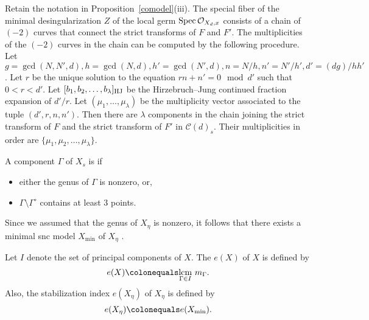 \begin{prop}\label{combdata}\cite[Chapter~3, Proposition~4.2.5]{halnic}
 Retain the notation in Proposition~\ref{comodel}(iii). The special fiber of the minimal desingularization $Z$ of the local germ $\operatorname{Spec} \mathcal{O}_{X_d,x}$ consists of a chain of $(-2)$ curves that connect the strict transforms of $F$ and $F'$. The multiplicities of the $(-2)$ curves in the chain can be computed by the following procedure. Let $g = \gcd(N,N',d), h = \gcd(N,d), h' = \gcd(N',d), n = N/h, n' = N'/{h'}, d'=(dg)/{hh'}$. Let $r$ be the unique solution to the equation $rn+n' = 0 \mod d'$ such that $0 < r < d'$. Let $[b_1,b_2,\ldots,b_{\lambda}]_{\textup{HJ}}$ be the Hirzebruch--Jung continued fraction expansion of $d'/r$. Let $(\mu_1,\ldots,\mu_{\lambda})$ be the multiplicity vector associated to the tuple $(d',r,n,n')$. Then there are $\lambda$ components in the chain joining the strict transform of $F$ and the strict transform of $F'$ in $\mathcal{C}(d)_s$. Their multiplicities in order are $\{\mu_1,\mu_2,\ldots,\mu_{\lambda}\}$.
\end{prop}

\begin{defin}\cite[Chapter~3, Definition~2.2.2]{halnic}
 A component $\Gamma$ of $X_s$ is {} if 
 \begin{itemize}
  \item either the genus of $\Gamma$ is nonzero, or,
  \item $\Gamma \setminus \Gamma^\circ$ contains at least $3$ points.
 \end{itemize}
\end{defin}

Since we assumed that the genus of $X_\eta$ is nonzero, it follows that there exists a minimal {\textup{snc}} model $X_{\mathrm{min}}$ of $X_\eta$ \cite[Chapter~9, Proposition~3.36]{liu}. 

\begin{defin}\cite[Chapter~3, Definition~2.2.3]{halnic}
 Let $I$ denote the set of principal components of $X$. The {} $e(X)$ of $X$ is defined by
 \[ e(X) \colonequals \underset{\Gamma \in I}{\lcm}\ m_{\Gamma} .\]
 Also, the stabilization index $e(X_\eta)$ of $X_\eta$ is defined by
 \[ e(X_\eta) \colonequals e(X_{\mathrm{min}}) .\]
\end{defin}

